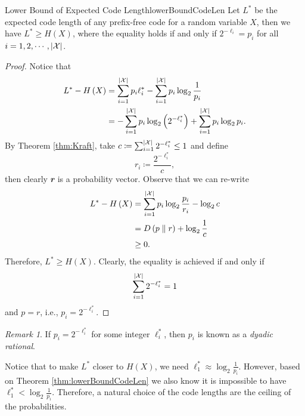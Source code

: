 \documentclass[math]{amznotes}
\theoremstyle{remark}
\newtheorem*{remark}{Remark}
\begin{document}
\begin{thmbox}{Lower Bound of Expected Code Length}{lowerBoundCodeLen}
    Let $L^*$ be the expected code length of any prefix-free code for a random variable $X$, then we have $L^* \geq H\left(X\right)$, where the equality holds if and only if $2^{-\ell_i} = p_i$ for all $i = 1, 2, \cdots, {\left\lvert {\mathcal{X}} \right\rvert}$.
    \tcblower
    \begin{proof}
        Notice that 
        \begin{align*}
            L^* - H\left(X\right) & = \sum_{i = 1}^{{\left\lvert {\mathcal{X}} \right\rvert}}p_i\ell^*_i - \sum_{i = 1}^{{\left\lvert {\mathcal{X}} \right\rvert}}p_i\log_2\frac{1}{p_i} \\
            & = -\sum_{i = 1}^{{\left\lvert {\mathcal{X}} \right\rvert}}p_i\log_2\left(2^{-\ell^*_i}\right) + \sum_{i = 1}^{{\left\lvert {\mathcal{X}} \right\rvert}}p_i\log_2{p_i}.
        \end{align*}
        By Theorem \ref{thm:Kraft}, take $c \coloneqq \sum_{i = 1}^{{\left\lvert {\mathcal{X}} \right\rvert}}2^{-\ell^*_i} \leq 1$ and define
        \begin{equation*}
            r_i \coloneqq \frac{2^{-\ell^*_i}}{c},
        \end{equation*}
        then clearly $\mathbfit{r}$ is a probability vector. Observe that we can re-write 
        \begin{align*}
            L^* - H\left(X\right) & = \sum_{i = 1}^{{\left\lvert {\mathcal{X}} \right\rvert}}p_i\log_2\frac{p_i}{r_i} - \log_2 c \\
            & = D\left(p \parallel r\right) + \log_2\frac{1}{c} \\
            & \geq 0.
        \end{align*}
        Therefore, $L^* \geq H\left(X\right)$. Clearly, the equality is achieved if and only if 
        \begin{equation*}
            \sum_{i = 1}^{{\left\lvert {\mathcal{X}} \right\rvert}}2^{-\ell^*_i} = 1
        \end{equation*}
        and $p = r$, i.e., $p_i = 2^{-\ell_i^*}$.
    \end{proof}
\end{thmbox}
\begin{notebox}
    \begin{remark}
        If $p_i = 2^{-\ell_i^*}$ for some integer $\ell_i^*$, then $p_i$ is known as a \textit{dyadic rational}.
    \end{remark}
\end{notebox}
Notice that to make $L^*$ closer to $H\left(X\right)$, we need $\ell_1^* \approx \log_2\frac{1}{p_i}$. However, based on Theorem \ref{thm:lowerBoundCodeLen} we also know it is impossible to have $\ell_1^* < \log_2\frac{1}{p_i}$. Therefore, a natural choice of the code lengths are the ceiling of the probabilities.
\end{document}
